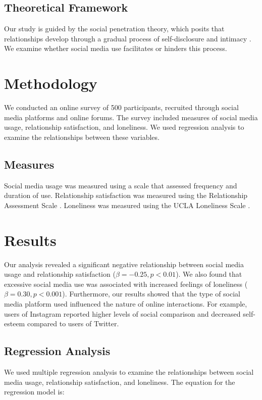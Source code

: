 \documentclass[12pt,a4paper]{article}
\begin{document}
\subsection{Theoretical Framework}
Our study is guided by the social penetration theory, which posits that relationships develop through a gradual process of self-disclosure and intimacy \citep{altman1973}. We examine whether social media use facilitates or hinders this process.

\section{Methodology}
We conducted an online survey of 500 participants, recruited through social media platforms and online forums. The survey included measures of social media usage, relationship satisfaction, and loneliness. We used regression analysis to examine the relationships between these variables.

\subsection{Measures}
Social media usage was measured using a scale that assessed frequency and duration of use. Relationship satisfaction was measured using the Relationship Assessment Scale \citep{hendrick1988}. Loneliness was measured using the UCLA Loneliness Scale \citep{russell1996}.

\section{Results}
Our analysis revealed a significant negative relationship between social media usage and relationship satisfaction ($\beta = -0.25, p < 0.01$). We also found that excessive social media use was associated with increased feelings of loneliness ($\beta = 0.30, p < 0.001$). Furthermore, our results showed that the type of social media platform used influenced the nature of online interactions. For example, users of Instagram reported higher levels of social comparison and decreased self-esteem compared to users of Twitter.

\subsection{Regression Analysis}
We used multiple regression analysis to examine the relationships between social media usage, relationship satisfaction, and loneliness. The equation for the regression model is:
\end{document}
